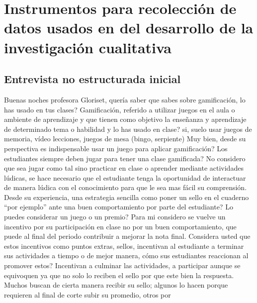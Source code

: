 %

\chapter{Instrumentos para recolección de datos usados en del desarrollo de la investigación cualitativa}
\label{anexo:encuestas}

\clearpage %
\section{Entrevista no estructurada inicial}

\begin{dialogue}
	 Buenas noches profesora Gloriset, quería saber que sabes sobre gamificación, lo has 
	usado en tus clases?
	 Gamificación, referido a utilizar juegos en el aula o ambiente de aprendizaje 
	y que tienen como objetivo la enseñanza y aprendizaje de determinado tema o habilidad
	 y lo has usado en clase?
 	 si, suelo usar juegos de memoria, vídeo lecciones, juegos de mesa (bingo, 
	serpiente)
 	 Muy bien, desde su perspectiva es indispensable usar un juego para aplicar 
	gamificación? Los estudiantes siempre deben jugar para tener una clase gamificada?
	 No considero que sea jugar como tal sino practicar en clase o aprender 
	mediante actividades lúdicas, se hace necesario que el estudiante tenga la oportunidad de interactuar 
	de manera lúdica con el conocimiento para que le sea mas fácil su comprensión.
	 Desde su experiencia, una estrategia sencilla como poner un sello en el cuaderno ``por 
	ejemplo'' ante una buen comportamiento por parte del estudiante?  Lo puedes considerar un juego o un 
	premio?
	  Para mi considero se vuelve un incentivo por su participación en clase no 
	 por un buen comportamiento, que puede al final del periodo contribuir a mejorar la nota final.
	  Considera usted que estos incentivos como puntos extras, sellos, incentivan al 
	 estudiante a terminar sus actividades a tiempo o de mejor manera, cómo sus estudiantes reaccionan al 
	 promover estos?
	  Incentivan a culminar las actividades, a participar aunque se equivoquen ya 
	 que no solo lo reciben el sello por que este bien la respuesta. Muchos buscan de cierta manera 
	 recibir su sello; algunos lo hacen porque requieren al final de corte subir su promedio, otros por 

\end{dialogue}
